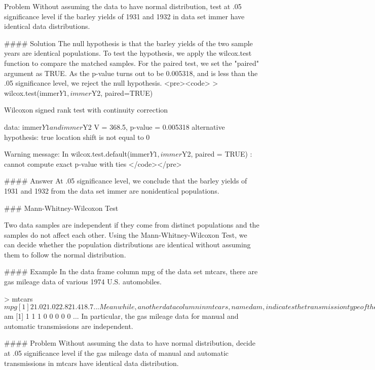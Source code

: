 \begin{frame}[fragile]  
Problem
Without assuming the data to have normal distribution, test at .05 significance level if the barley yields of 1931 and 1932 in data set immer have identical data distributions.

\end{frame}
\begin{frame}[fragile]
#### Solution
The null hypothesis is that the barley yields of the two sample years are identical populations. To test the hypothesis, we apply the wilcox.test function to compare the matched samples. For the paired test, we set the "paired" argument as TRUE. As the p-value turns out to be 0.005318, and is less than the .05 significance level, we reject the null hypothesis.
<pre><code>
> wilcox.test(immer$Y1, immer$Y2, paired=TRUE) 
 
        Wilcoxon signed rank test with continuity correction 
 
data:  immer$Y1 and immer$Y2 
V = 368.5, p-value = 0.005318 
alternative hypothesis: true location shift is not equal to 0 
 
Warning message: 
In wilcox.test.default(immer$Y1, immer$Y2, paired = TRUE) : 
  cannot compute exact p-value with ties
</code></pre>     

\end{frame}
\begin{frame}[fragile]
#### Answer
At .05 significance level, we conclude that the barley yields of 1931 and 1932 from the data set immer are nonidentical populations.

### Mann-Whitney-Wilcoxon Test

Two data samples are independent if they come from distinct populations and the samples do not affect each other. Using the Mann-Whitney-Wilcoxon Test, we can decide whether the population distributions are identical without assuming them to follow the normal distribution.


\end{frame}
\begin{frame}[fragile]
#### Example
In the data frame column mpg of the data set mtcars, there are gas mileage data of various 1974 U.S. automobiles.

> mtcars$mpg 
 [1] 21.0 21.0 22.8 21.4 18.7 ...
Meanwhile, another data column in mtcars, named am, indicates the transmission type of the automobile model (0 = automatic, 1 = manual). In other words, it is the differentiating factor of the transmission type.

> mtcars$am 
 [1] 1 1 1 0 0 0 0 0 ...
In particular, the gas mileage data for manual and automatic transmissions are independent.

#### Problem
Without assuming the data to have normal distribution, decide at .05 significance level if the gas mileage data of manual and automatic transmissions in mtcars have identical data distribution.


\end{frame}
